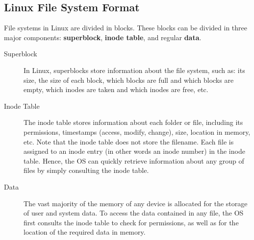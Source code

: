 \subsection{Linux File System Format}

File systems in Linux are divided in blocks. These blocks can be divided in three major components: \textbf{superblock}, \textbf{inode table}, and regular \textbf{data}.

\begin{description}
\item[Superblock] In Linux, superblocks store information about the file system, such as: its size, the size of each block, which blocks are full and which blocks are empty, which inodes are taken and which inodes are free, etc.

\item[Inode Table] The inode table stores information about each folder or file, including its permissions, timestamps (access, modify, change), size, location in memory, etc. Note that the inode table does not store the filename. Each file is assigned to an inode entry (in other words an inode number) in the inode table. Hence, the \acs{OS} can quickly retrieve information about any group of files by simply consulting the inode table.

\item[Data] The vast majority of the memory of any device is allocated for the storage of user and system data. To access the data contained in any file, the \acs{OS} first consults the inode table to check for permissions, as well as for the location of the required data in memory.
\end{description}

